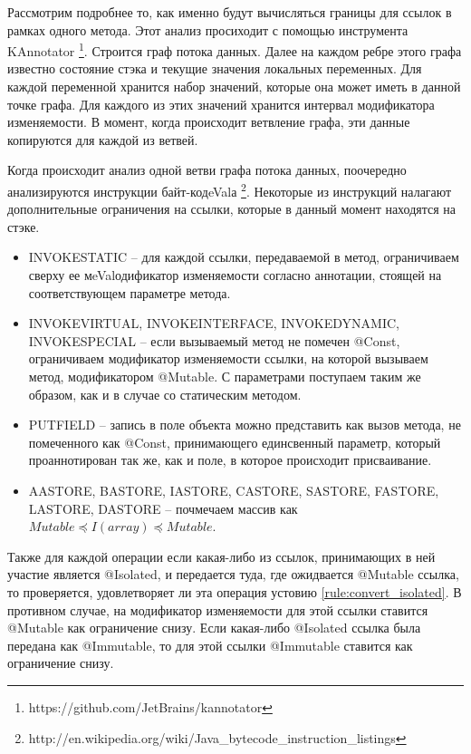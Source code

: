 Рассмотрим подробнее то, как именно будут вычисляться границы для ссылок в рамках одного метода. Этот анализ просиходит с помощью инструмента KAnnotator \footnote{https://github.com/JetBrains/kannotator}. Строится граф потока данных. Далее на каждом ребре этого графа известно состояние стэка и текущие значения локальных переменных. Для каждой переменной хранится набор значений, которые она может иметь в данной точке графа. Для каждого из этих значений хранится интервал модификатора изменяемости. В момент, когда происходит ветвление графа, эти данные копируются для каждой из ветвей. 

Когда происходит анализ одной ветви графа потока данных, поочередно анализируются инструкции байт-кодeValа \footnote{http://en.wikipedia.org/wiki/Java\_bytecode\_instruction\_listings}. Некоторые из инструкций налагают дополнительные ограничения на ссылки, которые в данный момент находятся на стэке.

\begin{itemize}
	\item {\small INVOKESTATIC} -- для каждой ссылки, передаваемой в метод, ограничиваем сверху ее мeValодификатор изменяемости согласно аннотации, стоящей на соответствующем параметре метода.  
	\item {\small INVOKEVIRTUAL, INVOKEINTERFACE, INVOKEDYNAMIC, INVOKESPECIAL} -- если вызываемый метод не помечен @Const, ограничиваем модификатор изменяемости ссылки, на которой вызываем метод, модификатором @Mutable. С параметрами поступаем таким же образом, как и в случае со статическим методом. 
	\item {\small PUTFIELD} -- запись в поле объекта можно представить как вызов метода, не помеченного как @Const, принимающего единсвенный параметр, который проаннотирован так же, как и поле, в которое происходит присваивание.
	\item {\small AASTORE, BASTORE, IASTORE, CASTORE, SASTORE, FASTORE, LASTORE, DASTORE} -- почмечаем массив как $Mutable \preceq I(array) \preceq Mutable$.
\end{itemize}

Также для каждой операции если какая-либо из ссылок, принимающих в ней участие является @Isolated, и передается туда, где ожидвается @Mutable ссылка, то проверяется, удовлетворяет ли эта операция устовию \ref{rule:convert_isolated}. В противном случае, на модификатор изменяемости для этой ссылки ставится @Mutable как ограничение снизу. Если какая-либо @Isolated ссылка была передана как @Immutable, то для этой ссылки @Immutable ставится как ограничение снизу.   

